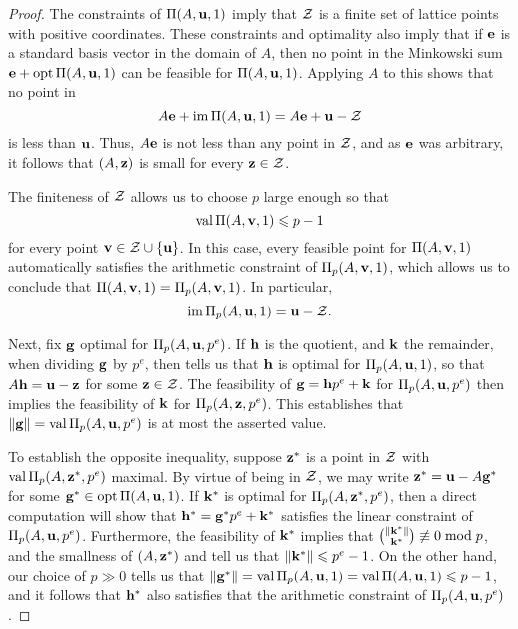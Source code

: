 \documentclass[11pt]{amsart}
\begin{document}
\begin{proof}
   The constraints of $\Pi(A, \mathbf{u}, 1)$ imply that $\mathcal{Z}$ is a finite set of lattice points with positive coordinates.   These constraints and optimality also imply that if $\mathbf{e}$ is a standard basis vector in the domain of $A$, then no point in the Minkowski sum $\mathbf{e} + \operatorname{opt} \Pi(A, \mathbf{u}, 1)$ can be feasible for $\Pi(A, \mathbf{u}, 1)$.  Applying $A$ to this shows that no point in
\[ A \mathbf{e} + \operatorname{im} \Pi(A, \mathbf{u}, 1) = A \mathbf{e} + \mathbf{u} - \mathcal{Z} \]
is less than $\mathbf{u}$.  Thus, $A \mathbf{e}$ is not less than any point in $\mathcal{Z}$, and as $\mathbf{e}$ was arbitrary, it follows that $(A, \mathbf{z})$ is small for every $\mathbf{z} \in \mathcal{Z}$.

The finiteness of $\mathcal{Z}$ allows us to choose $p$ large enough so that \[ \operatorname{val} \Pi(A, \mathbf{v}, 1) \leqslant p -1 \] for every point $\mathbf{v} \in \mathcal{Z} \cup \{ \mathbf{u} \}$.  In this case, every feasible point for $\Pi(A, \mathbf{v}, 1)$  automatically satisfies the arithmetic constraint of $\Pi_p(A, \mathbf{v}, 1)$, which allows us to conclude that $\Pi(A, \mathbf{v}, 1) = \Pi_p(A, \mathbf{v}, 1)$.  In particular,
\[ \operatorname{im} \Pi_p(A, \mathbf{u}, 1) =\mathbf{u} - \mathcal{Z}. \]

Next, fix $\mathbf{g}$ optimal for $\Pi_p(A, \mathbf{u}, p^e)$.  If $\mathbf{h}$ is the quotient, and $\mathbf{k}$ the remainder, when dividing $\mathbf{g}$ by $p^e$, then  tells us that $\mathbf{h}$ is optimal for $\Pi_p(A, \mathbf{u}, 1)$, so that $A \mathbf{h} = \mathbf{u}-\mathbf{z}$ for some $\mathbf{z} \in \mathcal{Z}$.  The feasibility of $\mathbf{g}=\mathbf{h}p^e + \mathbf{k}$ for $\Pi_p(A, \mathbf{u}, p^e)$ then implies the feasibility of $\mathbf{k}$ for $\Pi_p(A, \mathbf{z}, p^e)$.  This establishes that $\| \mathbf{g} \| = \operatorname{val} \Pi_p(A, \mathbf{u}, p^e)$ is at most the asserted value.

To establish the opposite inequality, suppose $\mathbf{z}^{\ast}$ is a point in $\mathcal{Z}$ with $\operatorname{val} \Pi_p(A, \mathbf{z}^{\ast}, p^e)$ maximal.  By virtue of being in $\mathcal{Z}$, we may write $\mathbf{z}^{\ast} = \mathbf{u} - A \mathbf{g}^{\ast}$ for some $\mathbf{g}^{\ast} \in \operatorname{opt} \Pi(A, \mathbf{u}, 1)$.  If $\mathbf{k}^{\ast}$ is optimal for $\Pi_p(A, \mathbf{z}^{\ast}, p^e)$, then a direct computation will show that
$\mathbf{h}^{\ast} = \mathbf{g}^{\ast} p^e + \mathbf{k}^{\ast}$ satisfies the linear constraint of  $\Pi_p(A, \mathbf{u}, p^e)$.  Furthermore, the feasibility of $\mathbf{k}^{\ast}$ implies that $\binom{\| \mathbf{k}^{\ast} \|}{\mathbf{k}^{\ast}} \not \equiv 0 \bmod p$, and the smallness of $(A, \mathbf{z}^{\ast})$ and  tell us that $\| \mathbf{k}^{\ast} \| \leqslant p^e-1$.  On the other hand, our choice of $p \gg 0$ tells us that $\| \mathbf{g}^{\ast} \| = \operatorname{val} \Pi_p(A, \mathbf{u}, 1) = \operatorname{val} \Pi(A, \mathbf{u}, 1) \leqslant p-1$, and it follows that $\mathbf{h}^{\ast}$ also satisfies that the arithmetic constraint of $\Pi_p(A, \mathbf{u}, p^e)$.
\end{proof}
\end{document}
